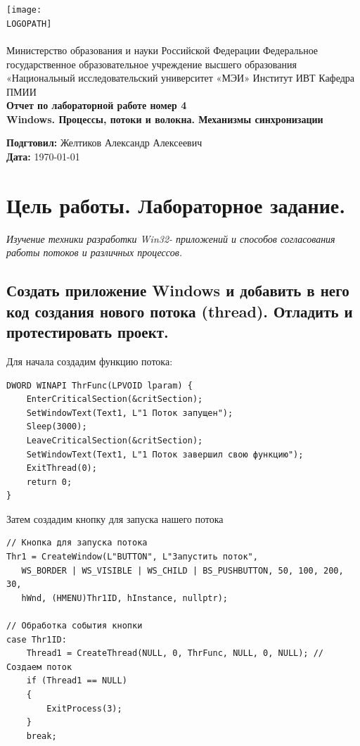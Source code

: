 \documentclass[12pt]{article}
\def \LOGOPATH {assets/logo3.png}
\def \DEPARTEMENT {Министерство образования и науки Российской Федерации 
Федеральное государственное образовательное учреждение высшего образования
\\ «Национальный исследовательский университет «МЭИ» 
Институт ИВТ
Кафедра ПМИИ
}
\def \REPORTTITLE {Отчет по лабораторной работе номер 4 \\ Windows. Процессы, потоки и волокна. Механизмы синхронизации}
\def \STUDENTNAME {Желтиков Александр Алексеевич}
\begin{document}

\begin{titlepage}
    \vfill
    \begin{center}
        \texttt{[image: \\LOGOPATH]} \\
        \hfill \\
        \Large{\DEPARTEMENT} \\
        \vfill
        \textbf{\LARGE{\REPORTTITLE}}
    \end{center}
    \vfill
    \begin{flushleft}
        \Large{\textbf{Подгтовил:} \STUDENTNAME} \\
        \Large{\textbf{Дата:} \today}
    \end{flushleft}
    \vfill
\end{titlepage}

\clearpage

\newpage
\tableofcontents
\newpage
\section{Цель работы. Лабораторное задание.}

\textit{Изучение техники разработки Win32- приложений и способов согласования работы потоков и различных процессов.} \\

\subsection{Создать приложение Windows и добавить в него код создания нового потока (thread). Отладить и протестировать проект.}

Для начала создадим функцию потока:\\

\begin{verbatim}
DWORD WINAPI ThrFunс(LPVOID lparam) {
    EnterCriticalSection(&critSection);
    SetWindowText(Text1, L"1 Поток запущен");
    Sleep(3000);
    LeaveCriticalSection(&critSection);
    SetWindowText(Text1, L"1 Поток завершил свою функцию");
    ExitThread(0);
    return 0;
}
\end{verbatim}

Затем создадим кнопку для запуска нашего потока\\


\begin{verbatim}
// Кнопка для запуска потока
Thr1 = CreateWindow(L"BUTTON", L"Запустить поток",
   WS_BORDER | WS_VISIBLE | WS_CHILD | BS_PUSHBUTTON, 50, 100, 200, 30, 
   hWnd, (HMENU)Thr1ID, hInstance, nullptr);
       
// Обработка события кнопки
case Thr1ID:
    Thread1 = CreateThread(NULL, 0, ThrFunс, NULL, 0, NULL); // Создаем поток
    if (Thread1 == NULL)
    {
        ExitProcess(3);
    }
    break;
\end{verbatim}
\end{document}
